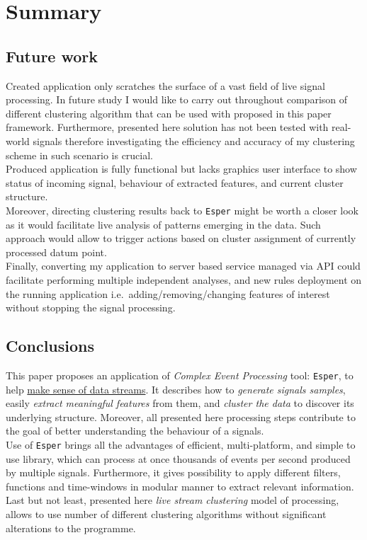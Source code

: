 \documentclass[11pt, letterpaper]{article}            %
\begin{document}
\section{Summary}
\subsection{Future work}
Created application only scratches the surface of a vast field of live signal processing. In future study I would like to carry out throughout comparison of different clustering algorithm that can be used with proposed in this paper framework. Furthermore, presented here solution has not been tested with real-world signals therefore investigating the efficiency and accuracy of my clustering scheme in such scenario is crucial.\\

Produced application is fully functional but lacks graphics user interface to show status of incoming signal, behaviour of extracted features, and current cluster structure.\\
Moreover, directing clustering results back to \texttt{Esper} might be worth a closer look as it would facilitate live analysis of patterns emerging in the data. Such approach would allow to trigger actions based on cluster assignment of currently processed datum point.\\
Finally, converting my application to server based service managed via API could facilitate performing multiple independent analyses, and new rules deployment on the running application i.e.\ adding/removing/changing features of interest without stopping the signal processing.\\

\subsection{Conclusions}
This paper proposes an application of \emph{Complex Event Processing} tool: \texttt{Esper}, to help \underline{make sense of data streams}. It describes how to \emph{generate signals samples}, easily \emph{extract meaningful features} from them, and \emph{cluster the data} to discover its underlying structure. Moreover, all presented here processing steps contribute to the goal of better understanding the behaviour of a signals.\\

Use of \texttt{Esper} brings all the advantages of efficient, multi-platform, and simple to use library, which can process at once thousands of events per second produced by multiple signals. Furthermore, it gives possibility to apply different filters, functions and time-windows in modular manner to extract relevant information. Last but not least, presented here \emph{live stream clustering} model of processing, allows to use number of different clustering algorithms without significant alterations to the programme.\\
\end{document}
